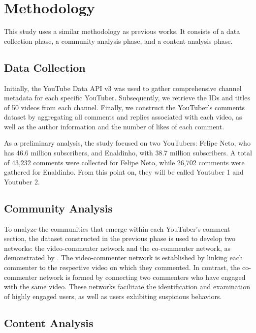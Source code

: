 \documentclass[12pt]{article}
\begin{document}
\section{Methodology}

This study uses a similar methodology as previous works. It consists of a data collection phase, 
a community analysis phase, and a content analysis phase.

\subsection{Data Collection}

Initially, the YouTube Data API v3 was used to gather comprehensive channel metadata for each 
specific YouTuber. Subsequently, we retrieve the IDs and titles of 50 videos from each channel. 
Finally, we construct the YouTuber's comments dataset by aggregating all comments and replies 
associated with each video, as well as the author information and the number of likes of each comment. 

As a preliminary analysis, the study focused on two YouTubers: Felipe Neto, who has 46.6 million 
subscribers, and Enaldinho, with 38.7 million subscribers. A total of 43,232 comments were collected 
for Felipe Neto, while 26,702 comments were gathered for Enaldinho. From this point on, they will
be called Youtuber 1 and Youtuber 2.

\subsection{Community Analysis}

To analyze the communities that emerge within each YouTuber's comment section, the dataset constructed 
in the previous phase is used to develop two networks: the video-commenter network and 
the co-commenter network, as demonstrated by \cite{hussain2018analyzing}. The video-commenter network 
is established by linking each commenter to the respective video on which they commented. 
In contrast, the co-commenter network is formed by connecting two commenters who have engaged with 
the same video. These networks facilitate the identification and examination of highly engaged users, 
as well as users exhibiting suspicious behaviors.

\subsection{Content Analysis}
\end{document}
